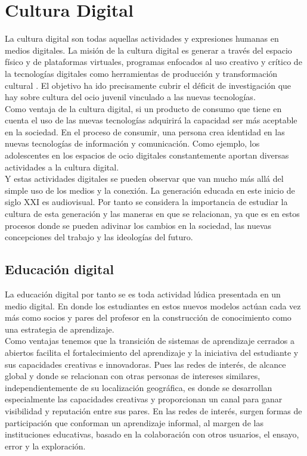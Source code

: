 \section{Cultura Digital}

La cultura digital son todas aquellas actividades y expresiones humanas en medios digitales. La misión de la cultura digital es generar a través del espacio físico y de plataformas virtuales, programas enfocados al uso creativo y crítico de la tecnologías digitales como herramientas de producción y transformación cultural \cite{vid08}. El objetivo ha ido precisamente cubrir el déficit de investigación que hay sobre cultura del ocio juvenil vinculado a las nuevas tecnologías.
\\[1pt] 

Como ventaja de la cultura digital, si un producto de consumo que tiene en cuenta el uso de las nuevas tecnologías adquirirá la capacidad ser más aceptable en la sociedad. En el proceso de consumir, una persona crea identidad en las nuevas tecnologías de información y comunicación. Como ejemplo, los adolescentes en los espacios de ocio digitales constantemente aportan diversas actividades a la cultura digital. 
\\[1pt]

Y estas actividades digitales se pueden observar que van mucho más allá del simple uso de los medios y la conexión. La generación educada en este inicio de siglo XXI es audiovisual. Por tanto se considera la importancia de estudiar la cultura de esta generación y las maneras en que se relacionan, ya que es en estos procesos donde se pueden adivinar los cambios en la sociedad, las nuevas concepciones del trabajo y las ideologías del futuro.
\\[1pt]

\subsection{Educación digital}

La educación digital por tanto se es toda actividad lúdica presentada en un medio digital. En donde los estudiantes en estos nuevos modelos actúan cada vez más como socios y pares del profesor en la construcción de conocimiento como una estrategia de aprendizaje. 
\\[1pt] 

Como ventajas tenemos que la transición de sistemas de aprendizaje cerrados a abiertos facilita el fortalecimiento del aprendizaje y la iniciativa del estudiante y sus capacidades creativas e innovadoras. Pues las redes de interés, de alcance global y donde se relacionan con otras personas de intereses similares, independientemente de su localización geográfica, es donde se desarrollan especialmente las capacidades creativas y proporcionan un canal para ganar visibilidad y reputación entre sus pares. En las redes de interés, surgen formas de participación que conforman un aprendizaje informal, al margen de las instituciones educativas, basado en la colaboración con otros usuarios, el ensayo, error y la exploración.
\\[1pt]

